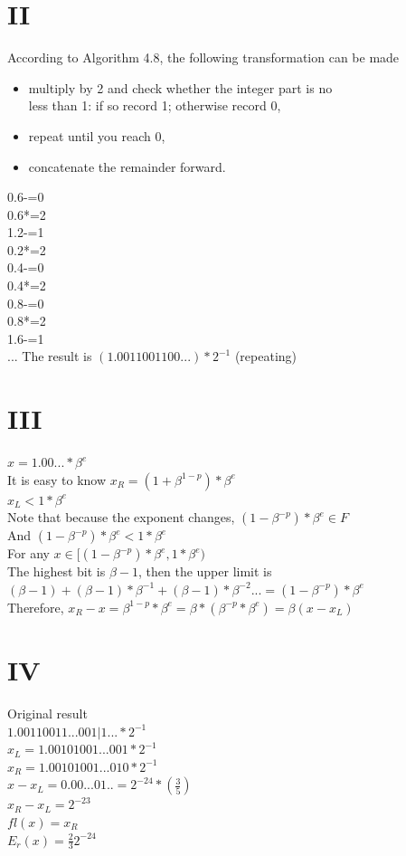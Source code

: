 \documentclass[a4paper]{article}
\begin{document}
\section*{II}
According to Algorithm 4.8, the following transformation can be made\\
\begin{itemize}
  \item multiply by 2 and check whether the integer part is no\\
    less than 1: if so record 1; otherwise record 0,\\
  \item repeat until you reach 0,\\
  \item concatenate the remainder forward.\\
\end{itemize}

0.6-=0\\
0.6*=2\\
1.2-=1\\
0.2*=2\\
0.4-=0\\
0.4*=2\\
0.8-=0\\
0.8*=2\\
1.6-=1\\
...
The result is $(1.0011001100...)*2^{-1}$ (repeating)\\

\section*{III}
$x=1.00...*\beta^e $\\
It is easy to know $x_R=(1+\beta^{1-p})*\beta^e$\\
$x_L < 1*\beta^e$\\
Note that because the exponent changes, $(1-\beta^{-p})*\beta^{e} \in F$\\
And $(1-\beta^{-p})*\beta^{e} <1*\beta^e$\\
For any $x\in [(1-\beta^{-p})*\beta^{e},1*\beta^e)$\\
The highest bit is $\beta-1$, then the upper limit is $(\beta-1)+(\beta-1)*\beta^{-1}+(\beta-1)*\beta^{-2}...=(1-\beta^{-p})*\beta^{e}$\\
Therefore, $x_R-x=\beta^{1-p}*\beta^e=\beta*(\beta^{-p}*\beta^{e})=\beta(x-x_L)$\\


\section*{IV}
Original result\\
$1.00110011...001|1...*2^{-1}$\\
$x_L=1.00101001...001*2^{-1}$\\
$x_R=1.00101001...010*2^{-1}$\\
$x-x_L=0.00...01..=2^{-24}*(\frac{3}{5})$\\
$x_R-x_L=2^{-23}$\\
$fl(x)=x_R$\\
$E_r(x)=\frac{2}{3}2^{-24}$\\
\end{document}
